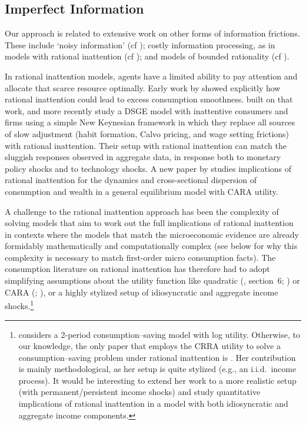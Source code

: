 \documentclass[titlepage]{article}
\begin{document}
\subsection{Imperfect Information}
Our approach is related to extensive work on other forms of information frictions. These include `noisy information' (cf \cite{pischkeMicroMacro}); costly information processing, as in models with rational inattention (cf \cite{simsInattention}); and models of bounded rationality (cf \cite{gabaixSparsityQJE}).

In rational inattention models, agents have a limited ability to pay attention and allocate that scarce resource optimally. Early work by \cite{reis:inattentive} showed explicitly how rational inattention could lead to excess consumption smoothness.
\cite{mw09:RI} built on that work, and more recently \cite{mackWiedREStud15} study a DSGE model with inattentive consumers and firms using a simple New Keynesian framework in which they replace all sources of slow adjustment (habit formation, Calvo pricing, and wage setting frictions) with rational inattention. Their setup with rational inattention can match the sluggish responses observed in aggregate data, in response both to monetary policy shocks and to technology shocks. A new paper by \cite{LuoRinGE} studies implications of rational inattention for the dynamics and cross-sectional dispersion of consumption and wealth in a general equilibrium model with CARA utility.

A challenge to the rational inattention approach has been the complexity of solving models that aim to work out the full implications of rational inattention in contexts where the models that match the microeconomic evidence are already formidably mathematically and computationally complex (see below for why this complexity is necessary to match first-order micro consumption facts).  The consumption literature on rational inattention has therefore had to adopt simplifying assumptions about the utility function like quadratic (\cite{simsInattention}, section~6; \cite{luo:inatC}) or CARA (\cite{LuoRinGE}; \cite{reis:inattentive}), or a highly stylized setup of idiosyncratic and aggregate income shocks.\footnote{\cite{sims_beyondLQ} considers a 2-period consumption--saving model with log utility. Otherwise, to our knowledge, the only paper that employs the CRRA utility to solve a consumption--saving problem under rational inattention is \cite{tutino_RIconsumption}. Her contribution is mainly methodological, as her setup is quite stylized (e.g., an i.i.d.\ income process).  It would be interesting to extend her work to a more realistic setup (with permanent/persistent income shocks) and study quantitative implications of rational inattention in a model with both idiosyncratic and aggregate income components.}
\end{document}
